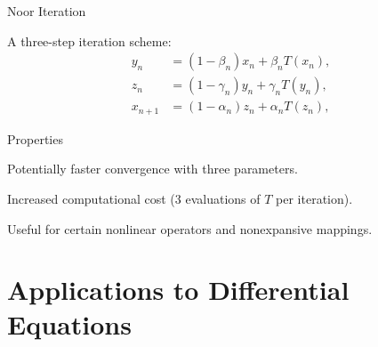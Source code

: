\documentclass[aspectratio=169,10pt]{beamer}
\begin{document}
\begin{frame}{Noor Iteration}
  \begin{definition}
    A three-step iteration scheme:
    \begin{align}
      y_n &= (1 - \beta_n) x_n + \beta_n T(x_n), \\
      z_n &= (1 - \gamma_n) y_n + \gamma_n T(y_n), \\
      x_{n+1} &= (1 - \alpha_n) z_n + \alpha_n T(z_n),
    \end{align}
  \end{definition}

  \vspace{0.3cm}

  \begin{block}{Properties}
    \item Potentially faster convergence with three parameters.
    \item Increased computational cost (3 evaluations of $T$ per iteration).
    \item Useful for certain nonlinear operators and nonexpansive mappings.
  \end{block}
\end{frame}

\section{Applications to Differential Equations}
\end{document}
